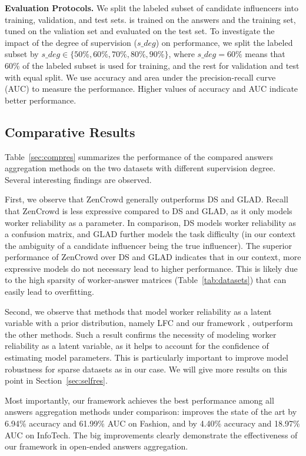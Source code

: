 \smallskip
\noindent\textbf{Evaluation Protocols.} We split the labeled subset of candidate influencers into training, validation, and test sets. \sys is trained on the answers and the training set, tuned on the valiation set and evaluated on the test set. To investigate the impact of the degree of supervision ($s\_deg$) on \sys performance, we split the labeled subset by $s\_deg\in \{50\%, 60\%, 70\%, 80\%, 90\%\}$, where $s\_deg = 60\%$ means that 60\% of the labeled subset is used for training, and the rest for validation and test with equal split. We use accuracy and area under the precision-recall curve (AUC) to measure the performance. Higher values of accuracy and AUC indicate better performance.



\subsection{Comparative Results}
Table~\ref{sec:compres} summarizes the performance of the compared answers aggregation methods on the two datasets with different supervision degree. Several interesting findings are observed.

First, we observe that ZenCrowd generally outperforms DS and GLAD. Recall that ZenCrowd is less expressive compared to DS and GLAD, as it only models worker reliability as a parameter. In comparison, DS models worker reliability as a confusion matrix, and GLAD further models the task difficulty (in our context the ambiguity of a candidate influencer being the true influencer). The superior performance of ZenCrowd  over DS and GLAD indicates that in our context, more expressive models do not necessary lead to higher performance. This is likely due to the high sparsity of worker-answer matrices (Table~\ref{tab:datasets}) that can easily lead to overfitting.

Second, we observe that methods that model worker reliability as a latent variable with a prior distribution, namely LFC and our framework \sys, outperform the other methods. Such a result confirms the necessity of modeling worker reliability as a latent variable, as it helps to account for the confidence of estimating model parameters. This is particularly important to improve model robustness for sparse datasets as in our case. We  will give more results on this point in Section~\ref{sec:selfres}.

Most importantly, our framework \sys achieves the best performance among all answers aggregation methods under comparison: \sys improves the state of the art by 6.94\% accuracy and 61.99\% AUC on Fashion, and by 4.40\% accuracy and 18.97\% AUC on InfoTech. The big improvements clearly demonstrate the effectiveness of our framework in open-ended answers aggregation. 



